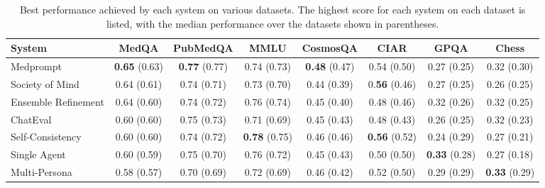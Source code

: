 \documentclass{article}  %
\begin{document}
\begin{table}[t!]
 \centering
  \begin{adjustbox}{width=\linewidth,center}
 \begin{tabular}{lccccccc}
    \textbf{System} & \textbf{MedQA} & \textbf{PubMedQA} & \textbf{MMLU} & \textbf{CosmosQA} & \textbf{CIAR} & \textbf{GPQA} & \textbf{Chess}\\
    \hline
    Medprompt            & \textbf{0.65} (0.63) & \textbf{0.77} (0.77) & 0.74 (0.73) & \textbf{0.48} (0.47) &0.54 (0.50) & 0.27 (0.25) & 0.32 (0.30)\\
    Society of Mind      & 0.64 (0.61) & 0.74 (0.71) & 0.73 (0.70) & 0.44 (0.39) &0.\textbf{56} (0.46) & 0.27 (0.25)& 0.26 (0.25) \\
    Ensemble Refinement  & 0.64 (0.60) & 0.74 (0.72) & 0.76 (0.74) & 0.45 (0.40) &0.48 (0.46) & 0.32 (0.26) & 0.32 (0.25)\\
    ChatEval             & 0.60 (0.60) & 0.75 (0.73) & 0.71 (0.69) & 0.45 (0.43) &0.48 (0.43) & 0.26 (0.25) & 0.32 (0.23)\\
    Self-Consistency     & 0.60 (0.60) & 0.74 (0.72) & \textbf{0.78} (0.75) & 0.46 (0.46) &\textbf{0.56} (0.52) & 0.24 (0.29) & 0.27 (0.21)\\
    Single Agent         & 0.60 (0.59) & 0.75 (0.70) & 0.76 (0.72) & 0.45 (0.43) &0.50 (0.50) & \textbf{0.33} (0.28) & 0.27 (0.18)\\
    Multi-Persona        & 0.58 (0.57) & 0.70 (0.69) & 0.72 (0.69) & 0.46 (0.42) & 0.52 (0.50) & 0.29 (0.29) & \textbf{0.33} (0.29)\\
    \bottomrule %
 \end{tabular}
\end{adjustbox}

     \caption{Best performance achieved by each system on various datasets. The highest score for each system on each dataset is listed, with the median performance over the datasets shown in parentheses.} \label{tab:best_config}
\end{table}
\end{document}
